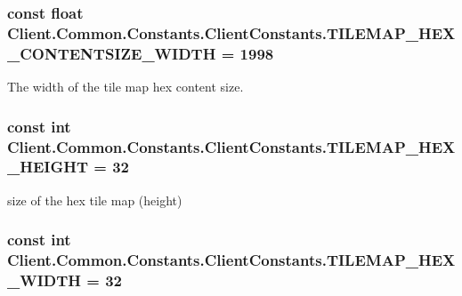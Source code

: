 \subsubsection[{T\+I\+L\+E\+M\+A\+P\+\_\+\+H\+E\+X\+\_\+\+C\+O\+N\+T\+E\+N\+T\+S\+I\+Z\+E\+\_\+\+W\+I\+D\+T\+H}]{\setlength{\rightskip}{0pt plus 5cm}const float Client.\+Common.\+Constants.\+Client\+Constants.\+T\+I\+L\+E\+M\+A\+P\+\_\+\+H\+E\+X\+\_\+\+C\+O\+N\+T\+E\+N\+T\+S\+I\+Z\+E\+\_\+\+W\+I\+D\+T\+H = 1998}\label{classClient_1_1Common_1_1Constants_1_1ClientConstants_af27377a5580d95e09167aa76fd8d2b6f}


The width of the tile map hex content size. 

\hypertarget{classClient_1_1Common_1_1Constants_1_1ClientConstants_aaf5b62017af7f14b0f431f2a0cdd6e84}{}
\subsubsection[{T\+I\+L\+E\+M\+A\+P\+\_\+\+H\+E\+X\+\_\+\+H\+E\+I\+G\+H\+T}]{\setlength{\rightskip}{0pt plus 5cm}const int Client.\+Common.\+Constants.\+Client\+Constants.\+T\+I\+L\+E\+M\+A\+P\+\_\+\+H\+E\+X\+\_\+\+H\+E\+I\+G\+H\+T = 32}\label{classClient_1_1Common_1_1Constants_1_1ClientConstants_aaf5b62017af7f14b0f431f2a0cdd6e84}


size of the hex tile map (height) 

\hypertarget{classClient_1_1Common_1_1Constants_1_1ClientConstants_a27089e6b9689c3f4f0866051e3515a85}{}
\subsubsection[{T\+I\+L\+E\+M\+A\+P\+\_\+\+H\+E\+X\+\_\+\+W\+I\+D\+T\+H}]{\setlength{\rightskip}{0pt plus 5cm}const int Client.\+Common.\+Constants.\+Client\+Constants.\+T\+I\+L\+E\+M\+A\+P\+\_\+\+H\+E\+X\+\_\+\+W\+I\+D\+T\+H = 32}\label{classClient_1_1Common_1_1Constants_1_1ClientConstants_a27089e6b9689c3f4f0866051e3515a85}


